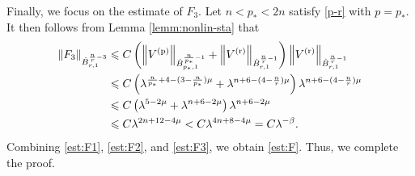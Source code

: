 \documentclass[a4paper,12pt,reqno]{amsart}
\theoremstyle{plain}
\theoremstyle{definition}
\newcommand{\dB}{\dot{B}}
\renewcommand{\leq}{\leqslant}
\newcommand{\n}[1]{{\left\|#1\right\|}}
\renewcommand{\sp}[1]{\left(#1\right)}
\begin{document}
Finally, we focus on the estimate of $F_3$.
Let $n<p_*<2n$ satisfy \eqref{p-r} with $p=p_*$.
It then follows from Lemma \ref{lemm:nonlin-sta} that
\begin{align}
    \n{F_3}_{\dB_{r,1}^{\frac{n}{r}-3}}
    &
    \leq 
    C
    \sp{
    \n{V^{({\rm p})}}_{\dB_{p_*,1}^{\frac{n}{p_*}-1}}
    +
    \n{V^{({\rm r})}}_{\dB_{r,1}^{\frac{n}{r}-1}}
    }
    \n{V^{({\rm r})}}_{\dB_{r,1}^{\frac{n}{r}-1}}
    \\
    &\leq 
    C
    \sp{
    \lambda^{\frac{n}{p_*}+4-(3-\frac{n}{p_*})\mu}
    +
    \lambda^{n+6-(4-\frac{n}{r})\mu}
    }
    \lambda^{n+6-(4-\frac{n}{r})\mu}
    \\
    &\leq 
    C
    \sp{
    \lambda^{5-2\mu}
    +
    \lambda^{n+6-2\mu}
    }
    \lambda^{n+6-2\mu}
    \\
    &
    \leq 
    C
    \lambda^{2n+12-4\mu}
    <
    C
    \lambda^{4n+8-4\mu}
    =
    C\lambda^{-\beta}.
    \label{est:F3}
\end{align}
Combining \eqref{est:F1}, \eqref{est:F2}, and \eqref{est:F3}, we obtain \eqref{est:F}.
Thus, we complete the proof.
\end{document}
